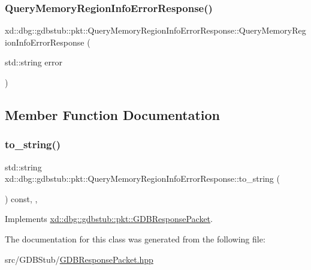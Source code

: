 \subsubsection{\texorpdfstring{Query\+Memory\+Region\+Info\+Error\+Response()}{QueryMemoryRegionInfoErrorResponse()}}
{\footnotesize\ttfamily xd\+::dbg\+::gdbstub\+::pkt\+::\+Query\+Memory\+Region\+Info\+Error\+Response\+::\+Query\+Memory\+Region\+Info\+Error\+Response (\begin{DoxyParamCaption}\item[{std\+::string}]{error }\end{DoxyParamCaption})\hspace{0.3cm}{\ttfamily [inline]}}



\subsection{Member Function Documentation}
\mbox{\label{classxd_1_1dbg_1_1gdbstub_1_1pkt_1_1_query_memory_region_info_error_response_af7a4e7c1a1c3a5dd8a1b6e6702101160}} 
\subsubsection{\texorpdfstring{to\+\_\+string()}{to\_string()}}
{\footnotesize\ttfamily std\+::string xd\+::dbg\+::gdbstub\+::pkt\+::\+Query\+Memory\+Region\+Info\+Error\+Response\+::to\+\_\+string (\begin{DoxyParamCaption}{ }\end{DoxyParamCaption}) const\hspace{0.3cm}{\ttfamily [inline]}, {\ttfamily [override]}, {\ttfamily [virtual]}}



Implements \mbox{\hyperlink{classxd_1_1dbg_1_1gdbstub_1_1pkt_1_1_g_d_b_response_packet_a2a15795536cd5ff94f0533c406233874}{xd\+::dbg\+::gdbstub\+::pkt\+::\+G\+D\+B\+Response\+Packet}}.



The documentation for this class was generated from the following file\+:\begin{DoxyCompactItemize}
\item 
src/\+G\+D\+B\+Stub/\mbox{\hyperlink{_g_d_b_response_packet_8hpp}{G\+D\+B\+Response\+Packet.\+hpp}}\end{DoxyCompactItemize}
